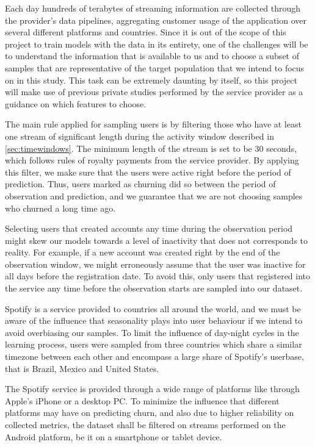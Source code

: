 \documentclass{kththesis}
\begin{document}
Each day hundreds of terabytes of streaming information are collected through the provider's data pipelines, aggregating customer usage of the application over several different platforms and countries. Since it is out of the scope of this project to train models with the data in its entirety, one of the challenges will be to understand the information that is available to us and to choose a subset of samples that are representative of the target population that we intend to focus on in this study. This task can be extremely daunting by itself, so this project will make use of previous private studies performed by the service provider as a guidance on which features to choose.

The main rule applied for sampling users is by filtering those who have at least one stream of significant length during the activity window described in \autoref{sec:timewindows}. The minimum length of the stream is set to be 30 seconds, which follows rules of royalty payments from the service provider. By applying this filter, we make sure that the users were active right before the period of prediction. Thus, users marked as churning did so between the period of observation and prediction, and we guarantee that we are not choosing samples who churned a long time ago.

Selecting users that created accounts any time during the observation period might skew our models towards a level of inactivity that does not corresponds to reality. For example, if a new account was created right by the end of the observation window, we might erroneously assume that the user was inactive for all days before the registration date. To avoid this, only users that registered into the service any time before the observation starts are sampled into our dataset. 

Spotify is a service provided to countries all around the world, and we must be aware of the influence that seasonality plays into user behaviour if we intend to avoid overbiasing our samples. To limit the influence of day-night cycles in the learning process, users were sampled from three countries which share a similar timezone between each other and encompass a large share of Spotify's userbase, that is Brazil, Mexico and United States. 

The Spotify service is provided through a wide range of platforms like through Apple's iPhone or a desktop PC. To minimize the influence that different platforms may have on predicting churn, and also due to higher reliability on collected metrics, the dataset shall be filtered on streams performed on the Android platform, be it on a smartphone or tablet device. 
\end{document}
